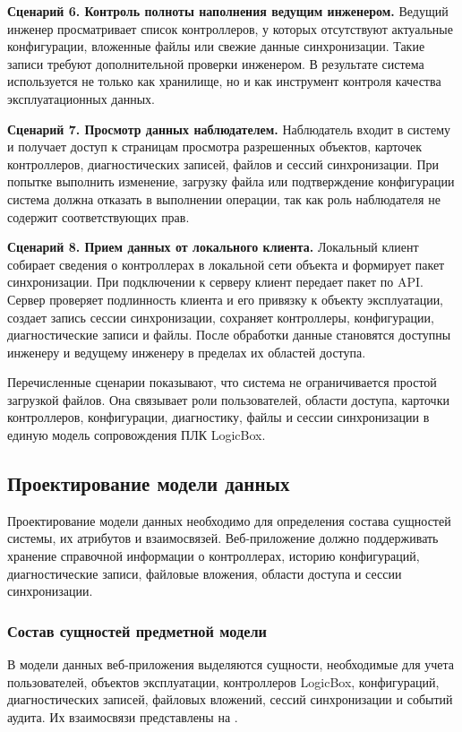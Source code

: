 \textbf{Сценарий 6. Контроль полноты наполнения ведущим инженером.} Ведущий инженер просматривает список контроллеров, у которых отсутствуют актуальные конфигурации, вложенные файлы или свежие данные синхронизации. Такие записи требуют дополнительной проверки инженером. В результате система используется не только как хранилище, но и как инструмент контроля качества эксплуатационных данных.

\textbf{Сценарий 7. Просмотр данных наблюдателем.} Наблюдатель входит в систему и получает доступ к страницам просмотра разрешенных объектов, карточек контроллеров, диагностических записей, файлов и сессий синхронизации. При попытке выполнить изменение, загрузку файла или подтверждение конфигурации система должна отказать в выполнении операции, так как роль наблюдателя не содержит соответствующих прав.

\textbf{Сценарий 8. Прием данных от локального клиента.} Локальный клиент собирает сведения о контроллерах в локальной сети объекта и формирует пакет синхронизации. При подключении к серверу клиент передает пакет по API. Сервер проверяет подлинность клиента и его привязку к объекту эксплуатации, создает запись сессии синхронизации, сохраняет контроллеры, конфигурации, диагностические записи и файлы. После обработки данные становятся доступны инженеру и ведущему инженеру в пределах их областей доступа.

Перечисленные сценарии показывают, что система не ограничивается простой загрузкой файлов. Она связывает роли пользователей, области доступа, карточки контроллеров, конфигурации, диагностику, файлы и сессии синхронизации в единую модель сопровождения ПЛК LogicBox.

\subsection{Проектирование модели данных}

Проектирование модели данных необходимо для определения состава сущностей системы, их атрибутов и взаимосвязей. Веб-приложение должно поддерживать хранение справочной информации о контроллерах, историю конфигураций, диагностические записи, файловые вложения, области доступа и сессии синхронизации.

\subsubsection{Состав сущностей предметной модели}

В модели данных веб-приложения выделяются сущности, необходимые для учета пользователей, объектов эксплуатации, контроллеров LogicBox, конфигураций, диагностических записей, файловых вложений, сессий синхронизации и событий аудита. Их взаимосвязи представлены на .

